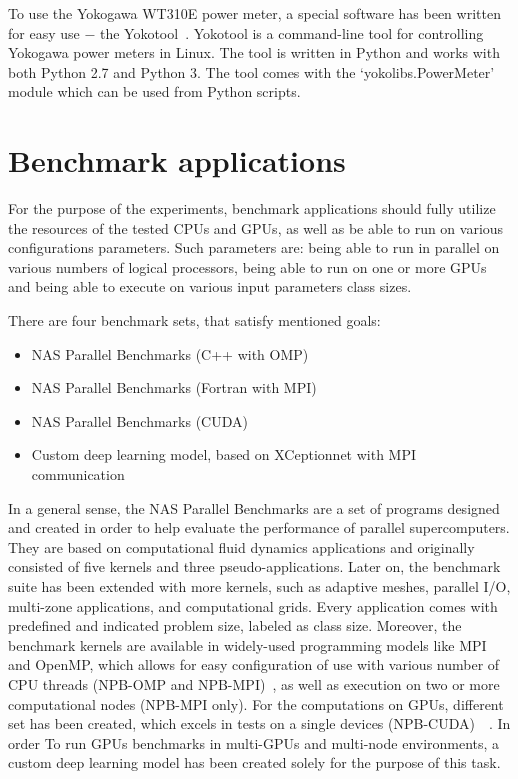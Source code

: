 To use the Yokogawa WT310E power meter, a special software has
been written for easy use $-$ the Yokotool~\cite{GitHub_intel/yoko-tool}.
Yokotool is a command-line tool for controlling Yokogawa power
meters in Linux. The tool is written in Python and works with both
Python 2.7 and Python 3. The tool comes with the
`yokolibs.PowerMeter' module which can be used from Python scripts.

\newpage

\section{Benchmark applications}

For the purpose of the experiments, benchmark applications should
fully utilize the resources of the tested CPUs and GPUs, as well as
be able to run on various configurations parameters. Such parameters
are: being able to run in parallel on various numbers of logical
processors, being able to run on one or more GPUs and being able to
execute on various input parameters class sizes.

There are four benchmark sets, that satisfy mentioned goals:
\begin{itemize}
    \item NAS Parallel Benchmarks (C++ with OMP)
    \item NAS Parallel Benchmarks (Fortran with MPI)
    \item NAS Parallel Benchmarks (CUDA)
    \item Custom deep learning model, based on XCeptionnet with MPI communication
\end{itemize}

In a general sense, the NAS Parallel Benchmarks are a set of programs designed
and created in order to help evaluate the performance of parallel
supercomputers. They are based on computational fluid dynamics applications and
originally consisted of five kernels and three pseudo-applications. Later on,
the benchmark suite has been extended with more kernels, such as adaptive meshes,
parallel I/O, multi-zone applications, and computational grids. Every application
comes with predefined and indicated problem size, labeled as class size.
Moreover, the benchmark kernels are available in widely-used programming
models like MPI and OpenMP, which allows for easy configuration of use with
various number of CPU threads (NPB-OMP and NPB-MPI)~\cite{NPB-CPP}, as well
as execution on two or more computational nodes (NPB-MPI only). For the
computations on GPUs, different set has been created, which excels in tests
on a single devices (NPB-CUDA)~\cite{NPB-CUDA_1}~\cite{NPB-CUDA_2}. In order To
run GPUs benchmarks in multi-GPUs and multi-node environments, a custom deep
learning model has been created solely for the purpose of this task.

